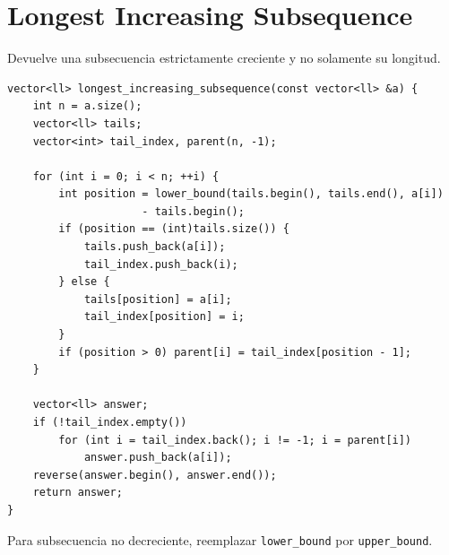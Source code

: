 \section{Longest Increasing Subsequence}

Devuelve una subsecuencia estrictamente creciente y no solamente su longitud.

\begin{lstlisting}[style=cpp]
vector<ll> longest_increasing_subsequence(const vector<ll> &a) {
    int n = a.size();
    vector<ll> tails;
    vector<int> tail_index, parent(n, -1);

    for (int i = 0; i < n; ++i) {
        int position = lower_bound(tails.begin(), tails.end(), a[i])
                     - tails.begin();
        if (position == (int)tails.size()) {
            tails.push_back(a[i]);
            tail_index.push_back(i);
        } else {
            tails[position] = a[i];
            tail_index[position] = i;
        }
        if (position > 0) parent[i] = tail_index[position - 1];
    }

    vector<ll> answer;
    if (!tail_index.empty())
        for (int i = tail_index.back(); i != -1; i = parent[i])
            answer.push_back(a[i]);
    reverse(answer.begin(), answer.end());
    return answer;
}
\end{lstlisting}


Para subsecuencia no decreciente, reemplazar \texttt{lower\_bound} por
\texttt{upper\_bound}.
